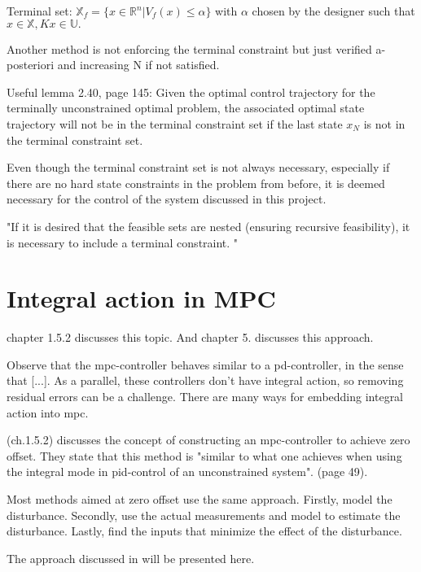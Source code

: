 Terminal set: $\mathbb{X}_f = \{ x \in \mathbb{R}^n | V_f(x) \leq \alpha \}$ with $\alpha$ chosen by the designer such that $x \in \mathbb{X}, Kx \in \mathbb{U}.$

Another method is not enforcing the terminal constraint but just verified a-posteriori and increasing N if not satisfied. 

Useful lemma 2.40, page 145:
Given the optimal control trajectory for the terminally unconstrained optimal problem, the associated optimal state trajectory will not be in the terminal constraint set if the last state $x_N$ is not in the terminal constraint set. 


Even though the terminal constraint set is not always necessary, especially if there are no hard state constraints in the problem from before, it is deemed necessary for the control of the system discussed in this project. 



"If it is desired that the feasible sets are nested (ensuring recursive feasibility), it is necessary to include a terminal constraint. "



\section{Integral action in MPC}

\cite{Rawlings&Mayne} chapter 1.5.2 discusses this topic.
And chapter 5.
\cite{merging_opt_control} discusses this approach. 

Observe that the \acrshort{mpc}-controller behaves similar to a \acrshort{pd}-controller, in the sense that [...]. As a parallel, these controllers don't have integral action, so removing residual errors can be a challenge. There are many ways for embedding integral action into \acrlong{mpc}. 

\cite{Rawlings&Mayne} (ch.1.5.2) discusses the concept of constructing an \acrshort{mpc}-controller to achieve zero offset. They state that this method is "similar to what one achieves when using the integral mode in \acrshort{pid}-control of an unconstrained system". \cite{Rawlings&Mayne} (page 49).

Most methods aimed at zero offset use the same approach. Firstly, model the disturbance. Secondly, use the actual measurements and model to estimate the disturbance. Lastly, find the inputs that minimize the effect of the disturbance. 

The approach discussed in \cite{merging_opt_control} will be presented here. 


